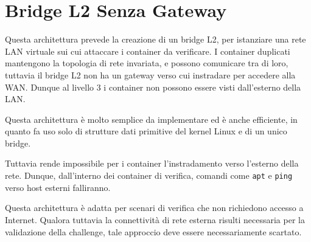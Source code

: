 \section{Bridge L2 Senza Gateway}\label{bridge-l2-senza-gateway}

Questa architettura prevede la creazione di un bridge L2, per istanziare
una rete LAN virtuale sui cui attaccare i container da verificare. I
container duplicati mantengono la topologia di rete invariata, e possono
comunicare tra di loro, tuttavia il bridge L2 non ha un gateway verso
cui instradare per accedere alla WAN. Dunque al livello 3 i container
non possono essere visti dall'esterno della LAN.

Questa architettura è molto semplice da implementare ed è anche
efficiente, in quanto fa uso solo di strutture dati primitive del kernel
Linux e di un unico bridge.

Tuttavia rende impossibile per i container l'instradamento verso
l'esterno della rete. Dunque, dall'interno dei container di verifica,
comandi come \passthrough{\lstinline!apt!} e
\passthrough{\lstinline!ping!} verso host esterni falliranno.

Questa architettura è adatta per scenari di verifica che non richiedono
accesso a Internet. Qualora tuttavia la connettività di rete esterna
risulti necessaria per la validazione della challenge, tale approccio
deve essere necessariamente scartato.
